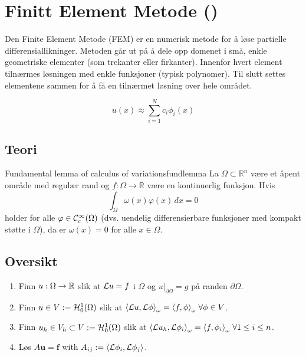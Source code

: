 \chapter{Finitt Element Metode ()}

Den Finite Element Metode (FEM) er en numerisk metode for å løse partielle differensiallikninger.
Metoden går ut på å dele opp domenet i små, enkle geometriske elementer (som trekanter eller firkanter).
Innenfor hvert element tilnærmes løsningen med enkle funksjoner (typisk polynomer).
Til slutt settes elementene sammen for å få en tilnærmet løsning over hele området.


\begin{equation}
  u(x) \approx \sum_{i=1}^N c_i \phi_i(x)
\end{equation}

\section{Teori}

\begin{lemma}{Fundamental lemma of calculus of variations}{fundlemma}
  La $\Omega \subset \mathbb{R}^n$ være et åpent område med regulær rand og $f: \Omega \rightarrow \mathbb{R}$ være en kontinuerlig funksjon. 
  Hvis
  \begin{equation}
    \int_{\Omega} \omega(x) \varphi(x) \, dx = 0 
  \end{equation}
  holder for alle $\varphi \in \Ccal_c^{\infty}(\Omega)$ (dvs. uendelig differensierbare funksjoner med kompakt støtte i $\Omega$), da er $\omega(x) = 0$ for alle $x \in \Omega$.
\end{lemma}

\section{Oversikt}
\begin{enumerate}
  \item Finn \(u: \Omega \rightarrow \R\) slik at \(\Lcal u = f\) i \(\Omega\) og \(u\big|_{\partial\Omega} = g\) på randen \(\partial\Omega\).

  \item Finn \(u \in V := \Hcal_0^1(\Omega)\) slik at \(\inner*{\Lcal u,\Lcal \phi}_\omega = \inner*{f, \phi}_\omega \; \forall \phi \in V\).

  \item Finn \(u_h \in V_h \subset V := \Hcal_0^1(\Omega)\) slik at \(\inner*{\Lcal u_h,\Lcal \phi_i}_\omega = \inner*{f, \phi_i}_\omega \; \forall 1\leq i \leq n\).

  \item Løs \(A\symbf{u} = \symbf{f}\) with \(A_{ij} := \inner*{\Lcal \phi_i, \Lcal \phi_j}\).
\end{enumerate}

